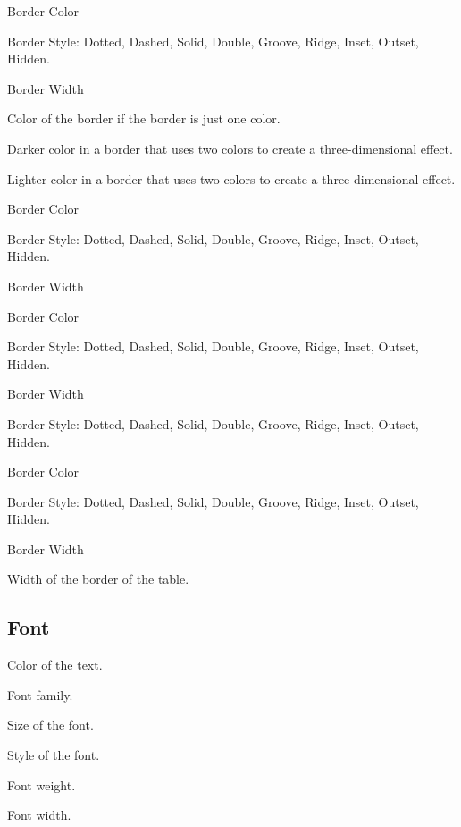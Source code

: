 \begin{description}

Border Color

Border Style: Dotted, Dashed, Solid, Double, Groove, Ridge, Inset, Outset, Hidden.

Border Width

Color of the border if the border is just one color.

Darker color in a border that uses two colors to create a three-dimensional effect.

Lighter color in a border that uses two colors to create a three-dimensional effect.

Border Color

Border Style: Dotted, Dashed, Solid, Double, Groove, Ridge, Inset, Outset, Hidden.

Border Width

Border Color

Border Style: Dotted, Dashed, Solid, Double, Groove, Ridge, Inset, Outset, Hidden.

Border Width

Border Style: Dotted, Dashed, Solid, Double, Groove, Ridge, Inset, Outset, Hidden.

Border Color

Border Style: Dotted, Dashed, Solid, Double, Groove, Ridge, Inset, Outset, Hidden.

Border Width

Width of the border of the table.

\end{description}

\subsection{Font}

\begin{description}

Color of the text.

Font family.

Size of the font.

Style of the font.

Font weight.

Font width.


\end{description}

